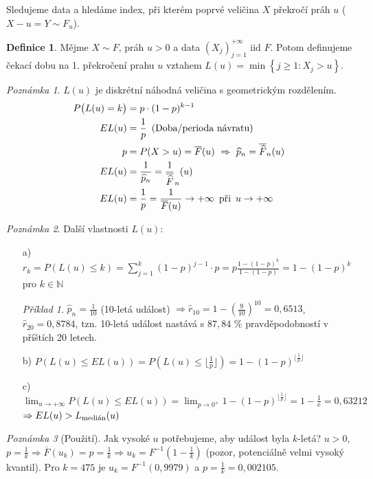 \documentclass{article}
\theoremstyle{remark}
\newtheorem*{remark}{Poznámka}
\theoremstyle{plain}
\theoremstyle{definition}
\newtheorem{definition}[subsubsection]{Definice}
\theoremstyle{remark}
\newtheorem*{example}{Příklad}
\begin{document}
Sledujeme data a hledáme index, při kterém poprvé veličina $X$ překročí práh $u$ ($X-u=Y\sim F_u$).

\begin{definition}
Mějme $X\sim F$, práh $u>0$ a data $(X_j)_{j=1}^{+\infty}$ iid $F$. Potom definujeme čekací dobu na 1. překročení prahu $u$ vztahem $L(u)=\min \left\{j\geq 1: X_j>u\right\}$.
\end{definition}

\begin{remark}
$L(u)$ je diskrétní náhodná veličina s geometrickým rozdělením.
\begin{align*}
    P\big(L(u)=k\big)&=p\cdot (1-p)^{k-1} \\
    EL(u)&=\frac{1}{p}\,\,\,(\textnormal{Doba/perioda návratu}) \\
    p&=P(X>u)=\overline{F}(u) \,\,\Rightarrow\,\, \widehat{p}_n=\overline{\widehat{F}}_n(u) \\
    EL(u)&=\frac{1}{\widehat{p}_n}=\frac{1}{\overline{\widehat{F}}}_n(u) \\
    EL(u)&=\frac{1}{p}=\frac{1}{\overline{F}(u)}\rightarrow +\infty\,\textnormal{ při }\, u\rightarrow +\infty
\end{align*}
\end{remark}

\begin{remark}
Další vlastnosti $L(u)$:
\begin{itemize}
\item[a)] $r_k=P(L(u)\leq k)=\sum_{j=1}^k (1-p)^{j-1}\cdot p=p\frac{1-(1-p)^k}{1-(1-p)}=1-(1-p)^k$ pro $k\in\mathbb{N}$
\begin{example}
$\widehat{p}_n=\frac{1}{10}$ (10-letá událost) $\Rightarrow \widehat{r}_{10}=1-\left(\frac{9}{10}\right)^{10}=0,6513$, $ \widehat{r}_{20}=0,8784$, tzn.  10-letá událost nastává s $87,84$ \% pravděpodobností v příštích 20 letech.
\end{example}
\item[b)] $P(L(u)\leq EL(u))=P(L(u)\leq\lfloor\frac{1}{p}\rfloor)=1-(1-p)^{\lfloor \frac{1}{p}\rfloor}$
\item[c)] $\lim_{u\rightarrow+\infty}P(L(u)\leq EL(u))=\lim_{p\rightarrow 0^+}1-(1-p)^{\lfloor \frac{1}{p}\rfloor}=1-\frac{1}{\mathrm{e}}=0,63212$ $\Rightarrow EL(u)>L_{\textnormal{medián}}(u)$
\end{itemize}
\end{remark}

\begin{remark}[Použití]
Jak vysoké $u$ potřebujeme, aby událost byla $k$-letá? \newline
$u>0$, $p=\frac{1}{k} \Rightarrow \overline{F}(u_k)=p=\frac{1}{k}\Rightarrow u_k=F^{-1}(1-\frac{1}{k})$ (pozor, potenciálně velmi vysoký kvantil). Pro $k=475$ je $u_k=F^{-1}(0,9979)$ a $p=\frac{1}{k}=0,002105$.

\end{remark}
\end{document}
